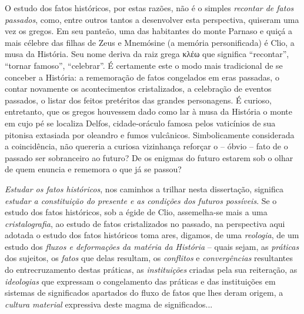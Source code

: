 O estudo dos fatos históricos, por estas razões, não é o simples \textit{recontar de fatos passados}, como, entre outros tantos a desenvolver esta perspectiva, quiseram uma vez os gregos. Em seu panteão, uma das habitantes do monte Parnaso e quiçá a mais célebre das filhas de Zeus e Mnemósine (a memória personificada) é Clio, a musa da História. Seu nome deriva da raiz grega \textgreek{κλέω} que significa ``recontar'', ``tornar famoso'', ``celebrar''. É certamente este o modo mais tradicional de se conceber a História: a rememoração de fatos congelados em eras passadas, o contar novamente os acontecimentos cristalizados, a celebração de eventos passados, o listar dos feitos pretéritos das grandes personagens. É curioso, entretanto, que os gregos houvessem dado como lar à musa da História o monte em cujo pé se localiza Delfos, cidade-oráculo famosa pelos vaticínios de sua pitonisa extasiada por oleandro e fumos vulcânicos. Simbolicamente considerada a coincidência, não quereria a curiosa vizinhança reforçar o – óbvio – fato de o passado ser sobranceiro ao futuro? De os enigmas do futuro estarem sob o olhar de quem enuncia e rememora o que já se passou?

\textit{Estudar os fatos históricos}, nos caminhos a trilhar nesta dissertação, significa \textit{estudar a constituição do presente e as condições dos futuros possíveis}. Se o estudo dos fatos históricos, sob a égide de Clio, assemelha-se mais a uma \textit{cristalografia}, ao estudo de fatos cristalizados no passado, na perspectiva aqui adotada o estudo dos fatos históricos toma ares, digamos, de uma \textit{reologia}, de um estudo dos \textit{fluxos e deformações da matéria da História} – quais sejam, as \textit{práticas} dos sujeitos, os \textit{fatos} que delas resultam, os \textit{conflitos} e \textit{convergências} resultantes do entrecruzamento destas práticas, as \textit{instituições} criadas pela sua reiteração, as \textit{ideologias} que expressam o congelamento das práticas e das instituições em sistemas de significados apartados do fluxo de fatos que lhes deram origem, a \textit{cultura material} expressiva deste magma de significados...

